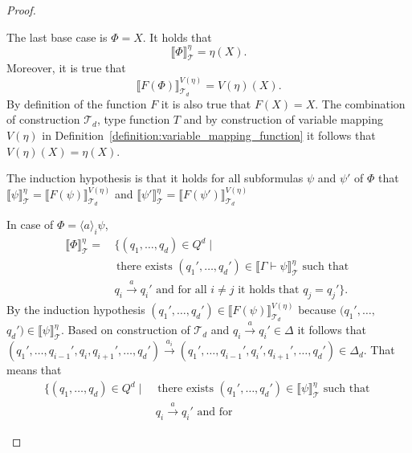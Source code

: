 \begin{proof}
\begin{compactitem}
        \item The last base case is $\Phi = X$. It holds that
        \[\llbracket \Phi \rrbracket^\eta_\mathcal{T} = \eta(X).\]
        Moreover, it is true that
        \[\llbracket F(\Phi) \rrbracket^{V(\eta)}_{\mathcal{T}_d} = V(\eta)(X).\]
        By definition of the function $F$ it is also true that $F(X) = X$. The combination of construction $\mathcal{T}_d$, type
        function $T$ and by construction of variable mapping $V(\eta)$ in
        Definition~\ref{definition:variable_mapping_function} it follows that $V(\eta)(X) = \eta(X)$. 
    \end{compactitem}
    The induction hypothesis is that it holds for all subformulas $\psi$ and $\psi'$ of $\Phi$ that $\llbracket
    \psi \rrbracket^\eta_\mathcal{T} = \llbracket F(\psi)
    \rrbracket^{V(\eta)}_{\mathcal{T}_d}$ and $\llbracket
    \psi' \rrbracket^\eta_\mathcal{T} = \llbracket F(\psi') 
    \rrbracket^{V(\eta)}_{\mathcal{T}_d}$
    \begin{compactitem}
        \item In case of $\Phi = \langle a \rangle_i \psi$,
        \begin{align*}
            \llbracket \Phi \rrbracket^\eta_\mathcal{T} = &\,
            \{(q_1, \dots, q_d) \in Q^d \mid \\&\text{ there exists } ({q_1}', \dots, {q_d}') \in \llbracket \Gamma
                \vdash \psi 
                \rrbracket^\eta_\mathcal{T} \text{ such that }\\&\,q_i \overset{a}{\rightarrow} {q_i}' \text{ and for
            all
            } i \neq j
            \text{ it holds that } q_j =
                {q_j}'\}.
        \end{align*}
        By the induction hypothesis $({q_1}', \dots, {q_d}') \in \llbracket F(\psi) \rrbracket^{V(\eta)}_{\mathcal{T}_d}$ because $({q_1}', \dots,$ $ {q_d}') \in \llbracket \psi \rrbracket^\eta_\mathcal{T}$. Based on construction of $\mathcal{T}_d$
        and $q_i \overset{a}{\rightarrow} {q_i}' \in \Delta$ it follows that $({q_1}', \dots, {q_{i - 1}'}, q_i,
        {q_{i + 1}'}, \dots, {q_d}') \overset{a_i}{\rightarrow} ({q_1}', \dots, {q_{i - 1}'}, {q_i}',
        {q_{i + 1}'}, \dots, {q_d}') \in \Delta_d$. That means that
        \begin{align*}
            \{(q_1, \dots, q_d) \in Q^d \mid &\text{ there exists } ({q_1}', \dots, {q_d}') \in \llbracket \psi 
            \rrbracket^\eta_\mathcal{T} \text{ such that }\\&\,q_i \overset{a}{\rightarrow} {q_i}' \text{ and for
}
\end{align*}
\end{compactitem}
\end{proof}
